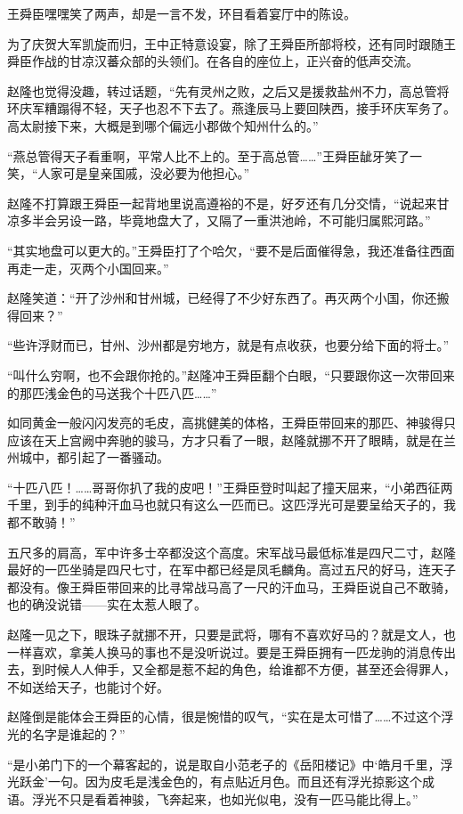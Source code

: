 王舜臣嘿嘿笑了两声，却是一言不发，环目看着宴厅中的陈设。

为了庆贺大军凯旋而归，王中正特意设宴，除了王舜臣所部将校，还有同时跟随王舜臣作战的甘凉汉蕃众部的头领们。在各自的座位上，正兴奋的低声交流。

赵隆也觉得没趣，转过话题，“先有灵州之败，之后又是援救盐州不力，高总管将环庆军糟蹋得不轻，天子也忍不下去了。燕逢辰马上要回陕西，接手环庆军务了。高太尉接下来，大概是到哪个偏远小郡做个知州什么的。”

“燕总管得天子看重啊，平常人比不上的。至于高总管……”王舜臣龇牙笑了一笑，“人家可是皇亲国戚，没必要为他担心。”

赵隆不打算跟王舜臣一起背地里说高遵裕的不是，好歹还有几分交情，“说起来甘凉多半会另设一路，毕竟地盘大了，又隔了一重洪池岭，不可能归属熙河路。”

“其实地盘可以更大的。”王舜臣打了个哈欠，“要不是后面催得急，我还准备往西面再走一走，灭两个小国回来。”

赵隆笑道：“开了沙州和甘州城，已经得了不少好东西了。再灭两个小国，你还搬得回来？”

“些许浮财而已，甘州、沙州都是穷地方，就是有点收获，也要分给下面的将士。”

“叫什么穷啊，也不会跟你抢的。”赵隆冲王舜臣翻个白眼，“只要跟你这一次带回来的那匹浅金色的马送我个十匹八匹……”

如同黄金一般闪闪发亮的毛皮，高挑健美的体格，王舜臣带回来的那匹、神骏得只应该在天上宫阙中奔驰的骏马，方才只看了一眼，赵隆就挪不开了眼睛，就是在兰州城中，都引起了一番骚动。

“十匹八匹！……哥哥你扒了我的皮吧！”王舜臣登时叫起了撞天屈来，“小弟西征两千里，到手的纯种汗血马也就只有这么一匹而已。这匹浮光可是要呈给天子的，我都不敢骑！”

五尺多的肩高，军中许多士卒都没这个高度。宋军战马最低标准是四尺二寸，赵隆最好的一匹坐骑是四尺七寸，在军中都已经是凤毛麟角。高过五尺的好马，连天子都没有。像王舜臣带回来的比寻常战马高了一尺的汗血马，王舜臣说自己不敢骑，也的确没说错——实在太惹人眼了。

赵隆一见之下，眼珠子就挪不开，只要是武将，哪有不喜欢好马的？就是文人，也一样喜欢，拿美人换马的事也不是没听说过。要是王舜臣拥有一匹龙驹的消息传出去，到时候人人伸手，又全都是惹不起的角色，给谁都不方便，甚至还会得罪人，不如送给天子，也能讨个好。

赵隆倒是能体会王舜臣的心情，很是惋惜的叹气，“实在是太可惜了……不过这个浮光的名字是谁起的？”

“是小弟门下的一个幕客起的，说是取自小范老子的《岳阳楼记》中‘皓月千里，浮光跃金’一句。因为皮毛是浅金色的，有点贴近月色。而且还有浮光掠影这个成语。浮光不只是看着神骏，飞奔起来，也如光似电，没有一匹马能比得上。”

